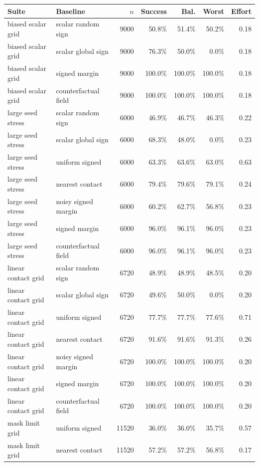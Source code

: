 \begin{tabular}{llrrrrr}\toprule
Suite & Baseline & $n$ & Success & Bal. & Worst & Effort\\
\midrule
biased scalar grid & scalar random sign & 9000 & 50.8\% & 51.4\% & 50.2\% & 0.18\\
biased scalar grid & scalar global sign & 9000 & 76.3\% & 50.0\% & 0.0\% & 0.18\\
biased scalar grid & signed margin & 9000 & 100.0\% & 100.0\% & 100.0\% & 0.18\\
biased scalar grid & counterfactual field & 9000 & 100.0\% & 100.0\% & 100.0\% & 0.18\\
large seed stress & scalar random sign & 6000 & 46.9\% & 46.7\% & 46.3\% & 0.22\\
large seed stress & scalar global sign & 6000 & 68.3\% & 48.0\% & 0.0\% & 0.23\\
large seed stress & uniform signed & 6000 & 63.3\% & 63.6\% & 63.0\% & 0.63\\
large seed stress & nearest contact & 6000 & 79.4\% & 79.6\% & 79.1\% & 0.24\\
large seed stress & noisy signed margin & 6000 & 60.2\% & 62.7\% & 56.8\% & 0.23\\
large seed stress & signed margin & 6000 & 96.0\% & 96.1\% & 96.0\% & 0.23\\
large seed stress & counterfactual field & 6000 & 96.0\% & 96.1\% & 96.0\% & 0.23\\
linear contact grid & scalar random sign & 6720 & 48.9\% & 48.9\% & 48.5\% & 0.20\\
linear contact grid & scalar global sign & 6720 & 49.6\% & 50.0\% & 0.0\% & 0.20\\
linear contact grid & uniform signed & 6720 & 77.7\% & 77.7\% & 77.6\% & 0.71\\
linear contact grid & nearest contact & 6720 & 91.6\% & 91.6\% & 91.3\% & 0.26\\
linear contact grid & noisy signed margin & 6720 & 100.0\% & 100.0\% & 100.0\% & 0.20\\
linear contact grid & signed margin & 6720 & 100.0\% & 100.0\% & 100.0\% & 0.20\\
linear contact grid & counterfactual field & 6720 & 100.0\% & 100.0\% & 100.0\% & 0.20\\
mask limit grid & uniform signed & 11520 & 36.0\% & 36.0\% & 35.7\% & 0.57\\
mask limit grid & nearest contact & 11520 & 57.2\% & 57.2\% & 56.8\% & 0.17\\

\end{tabular}

